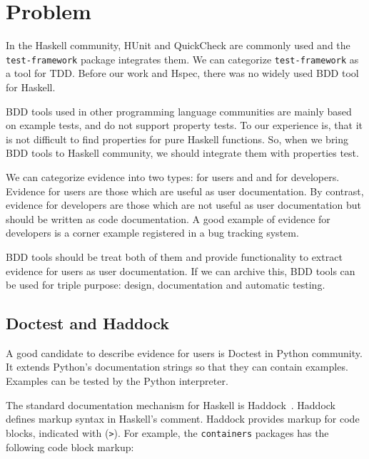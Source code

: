 \documentclass[preprint]{sigplanconf}
\begin{document}

\section{Problem}

In the Haskell community, HUnit and QuickCheck are commonly used %
and the {\tt test-framework} package integrates them.
We can categorize {\tt test-framework} as
a tool for TDD.
Before our work and Hspec, there was no widely used BDD tool for Haskell.

BDD tools used in other programming language communities are
mainly based on example tests,
and do not support property tests.
To our experience is, that it is not difficult to find properties for
pure Haskell functions.
So, when we bring BDD tools to
Haskell community, we should integrate them with properties test.

We can categorize evidence into two types: for users and
and for developers.
Evidence for users are those which are useful as user documentation.
By contrast, evidence for developers are
those which are not useful as user documentation
but should be written as code documentation.
A good example of evidence for developers
is a corner example registered in a bug tracking system.

BDD tools should be treat both of them and provide functionality
to extract evidence for users as user documentation.
If we can archive this, BDD tools can be used for
triple purpose: design, documentation and automatic testing.

\subsection{Doctest and Haddock}

A good candidate to describe evidence for users is Doctest in Python community.
It extends Python's documentation strings so that they
can contain examples.
Examples can be tested by the Python interpreter.

The standard documentation mechanism for Haskell is
Haddock~\cite{haddock}.
Haddock defines markup syntax in Haskell's comment.
Haddock provides markup for code blocks, indicated with ({\tt >}).
For example, the {\tt containers} packages has the following code block markup:
\end{document}
